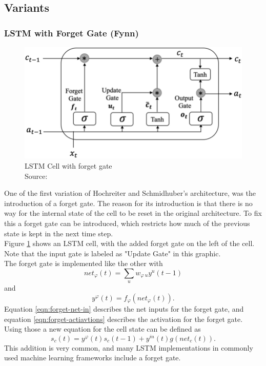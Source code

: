 \documentclass[twoside,a4paper,10pt,DIV=12,BCOR=12mm]{scrartcl}
\begin{document}
\subsection{Variants}

\subsubsection{LSTM with Forget Gate (Fynn)}
\begin{figure}[h]
    \centering
    \includegraphics[width=0.75\linewidth]{Structure-of-LSTM-cell-which-introduces-three-special-gates-Input-Gate-i-Forget-Gate.png}
    \caption{LSTM Cell with forget gate\\ Source: \cite{nguyen2022lstmforgetgraphic}}
    \label{fig:lstm-forget}
\end{figure}
One of the first variation of Hochreiter and Schmidhuber's architecture, was the introduction of a forget gate. The reason for its introduction is that there is no way for the internal state of the cell to be reset in the original architecture. To fix this a forget gate can be introduced, which restricts how much of the previous state is kept in the next time step.\cite{gers1999forgetgate}\\
Figure \ref{fig:lstm-forget} shows an LSTM cell, with the added forget gate on the left of the cell. Note that the input gate is labeled as "Update Gate" in this graphic.\\
The forget gate is implemented like the other with\cite{gers1999forgetgate}
\begin{equation}
    net_\varphi(t)=\sum_uw_{\varphi\ u}y^u(t-1)
    \label{eqn:forget-net-in}
\end{equation}
and
\begin{equation}
    y^\varphi(t)=f_\varphi\left(net_\varphi(t)\right).
    \label{eqn:forget-actiavtions}
\end{equation} 
Equation \ref{eqn:forget-net-in} describes the net inputs for the forget gate, and equation \ref{eqn:forget-actiavtions} describes the activation for the forget gate. Using those a new equation for the cell state can be defined as\cite{gers1999forgetgate}
\begin{equation}
    s_c(t)=y^\varphi(t)s_c(t-1)+y^{in}(t)g\left(net_c(t)\right).    
\end{equation}
  This addition is very common, and many LSTM implementations in commonly used machine learning frameworks include a forget gate.\cite{keras-lstm, pytorch-lstm}
\end{document}
